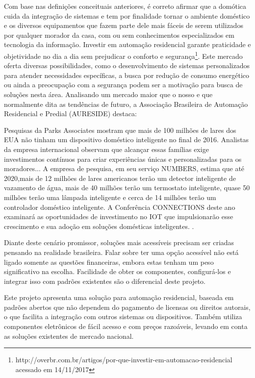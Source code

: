Com base nas definições conceituais anteriores, é correto afirmar que a domótica cuida da integração de sistemas e tem por finalidade tornar o ambiente doméstico e os diversos equipamentos que fazem parte dele mais fáceis de serem utilizados por qualquer morador da casa, com ou sem conhecimentos especializados em tecnologia da informação. Investir em automação residencial garante praticidade e objetividade no dia a dia sem prejudicar o conforto e segurança\footnote{http://overbr.com.br/artigos/por-que-investir-em-automacao-residencial acessado em 14/11/2017}. Este mercado oferta diversas possibilidades, como o desenvolvimento de sistemas personalizados para atender necessidades específicas, a busca por redução de consumo energético ou ainda a preocupação com a segurança podem ser a motivação para busca de soluções nesta área. Analisando um mercado maior que o nosso e que normalmente dita as tendências de futuro, a Associação Brasileira de Automação Residencial e Predial (AURESIDE) destaca:

\begin{citacao}
Pesquisas da Parks Associates mostram que mais de 100 milhões de lares dos EUA não tinham um dispositivo doméstico inteligente no final de 2016. Analistas da empresa internacional observam que alcançar essas famílias exige investimentos contínuos para criar experiências únicas e personalizadas para os moradores... 
A empresa de pesquisa, em seu serviço NUMBERS, estima que até 2020,mais de 12 milhões de lares americanos terão um detector inteligente de vazamento de água, mais de 40 milhões terão um termostato inteligente, quase 50 milhões terão uma lâmpada inteligente e cerca de 14 milhões terão um controlador doméstico inteligente. A Conferência CONNECTIONS deste ano examinará as oportunidades de investimento no IOT que impulsionarão esse crescimento e sua adoção em soluções domésticas inteligentes. \cite{MERCADO}.
\end{citacao}

Diante deste cenário promissor, soluções mais acessíveis precisam ser criadas pensando na realidade brasileira. Falar sobre ter uma opção acessível não está ligado somente as questões financeiras, embora estas tenham um peso significativo na escolha. Facilidade de obter os componentes, configurá-los e integrar isso com padrões existentes são o diferencial deste projeto.

Este projeto apresenta uma solução para automação residencial, baseada em padrões abertos que não dependem do pagamento de licensas ou direitos autorais, o que facilita a integração com outros sistemas ou dispositivos. Também utiliza componentes eletrônicos de fácil acesso e com preços razoáveis, levando em conta as soluções existentes de mercado nacional.


